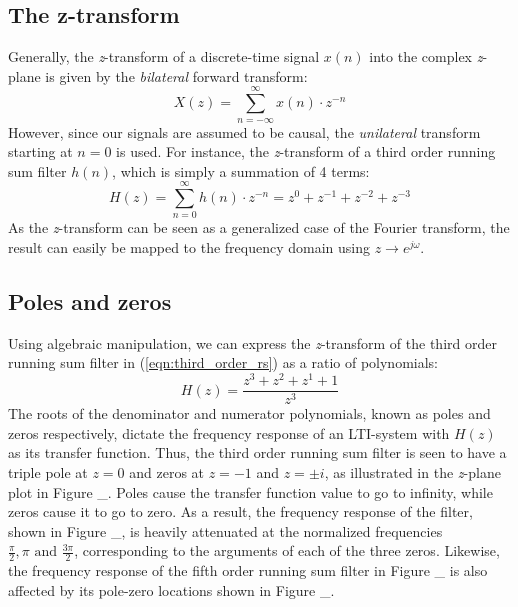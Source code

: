 \documentclass[journal]{IEEEtran}
\begin{document}
\subsection{The z-transform}
Generally, the \textit{z}-transform of a discrete-time signal $x(n)$ into the complex \textit{z}-plane is given by the \textit{bilateral} forward transform: 
\begin{equation}
\label{eqn:z_transform}
    X(z) = \sum_{n=-\infty}^{\infty} x(n) \cdot z^{-n}
\end{equation}
However, since our signals are assumed to be causal, the \textit{unilateral} transform starting at $n=0$ is used. For instance, the \textit{z}-transform of a third order running sum filter $h(n)$, which is simply a summation of 4 terms: 
\begin{equation}
\label{eqn:third_order_rs}
    H(z) = \sum_{n=0}^{\infty} h(n) \cdot z^{-n} = z^{0} + z^{-1} + z^{-2} + z^{-3} 
\end{equation}
As the \textit{z}-transform can be seen as a generalized case of the Fourier transform, the result can easily be mapped to the frequency domain using $z \rightarrow e^{j \omega}$.

\subsection{Poles and zeros}
Using algebraic manipulation, we can express the \textit{z}-transform of the third order running sum filter in (\ref{eqn:third_order_rs}) as a ratio of polynomials: 
\begin{equation}
\label{eqn:third_order_rs_tf}
    H(z) = \frac{z^3+z^2+z^1+1}{z^3}
\end{equation}
The roots of the denominator and numerator polynomials, known as poles and zeros respectively, dictate the frequency response of an LTI-system with $H(z)$ as its transfer function. Thus, the third order running sum filter is seen to have a triple pole at $z=0$ and zeros at $z=-1$ and $z=\pm i$, as illustrated in the \textit{z}-plane plot in Figure \_. Poles cause the transfer function value to go to infinity, while zeros cause it to go to zero. As a result, the frequency response of the filter, shown in Figure \_, is heavily attenuated at the normalized frequencies $\frac{\pi}{2}, \pi \text{ and } \frac{3 \pi}{2}$, corresponding to the arguments of each of the three zeros. Likewise, the frequency response of the fifth order running sum filter in Figure \_ is also affected by its pole-zero locations shown in Figure \_. 
\end{document}
